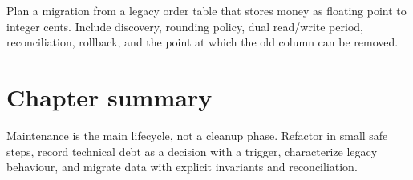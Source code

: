 \begin{exercise}
Plan a migration from a legacy order table that stores money as floating point to
integer cents. Include discovery, rounding policy, dual read/write period,
reconciliation, rollback, and the point at which the old column can be removed.
\end{exercise}

\section{Chapter summary}
Maintenance is the main lifecycle, not a cleanup phase. Refactor in small safe
steps, record technical debt as a decision with a trigger, characterize legacy
behaviour, and migrate data with explicit invariants and reconciliation.


